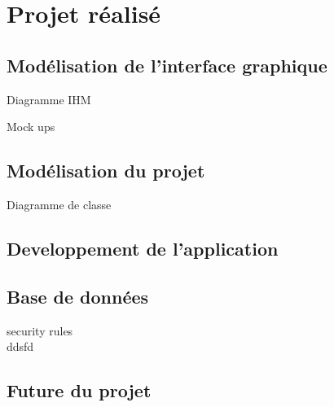 \chapter{Projet réalisé}












\section{Modélisation de l'interface graphique}
Diagramme IHM

Mock ups

\section{Modélisation du projet}
Diagramme de classe

\section{Developpement de l'application}


\section{Base de données}
security rules \\
ddsfd




\section{Future du projet}
